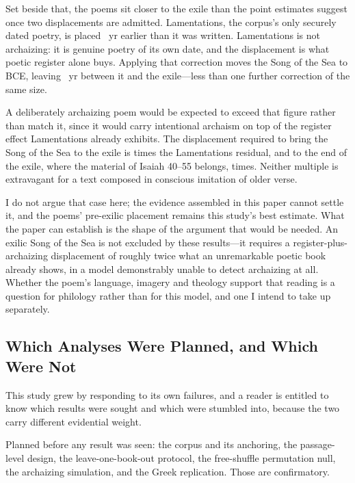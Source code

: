 \documentclass[10pt,letterpaper]{article}
\begin{document}
Set beside that, the poems sit closer to the exile than the point estimates
suggest once two displacements are admitted.  Lamentations, the corpus's only
securely dated poetry, is placed \genPoetryAbs~yr earlier than it was written.
Lamentations is not archaizing: it is genuine poetry of its own date, and the
displacement is what poetic register alone buys.  Applying that correction moves
the Song of the Sea to \DETseaAdj{} BCE, leaving \DETseaAdjMargin~yr between it
and the exile---less than one further correction of the same size.

A deliberately archaizing poem would be expected to exceed that figure rather
than match it, since it would carry intentional archaism on top of the register
effect Lamentations already exhibits.  The displacement required to bring the
Song of the Sea to the exile is \DETseaExileX{} times the Lamentations residual,
and to the end of the exile, where the material of Isaiah 40--55 belongs,
\DETseaDeuteroX{} times.  Neither multiple is extravagant for a text composed in
conscious imitation of older verse.

I do not argue that case here; the evidence assembled in this paper cannot
settle it, and the poems' pre-exilic placement remains this study's best
estimate.  What the paper can establish is the shape of the argument that would
be needed.  An exilic Song of the Sea is not excluded by these results---it
requires a register-plus-archaizing displacement of roughly twice what an
unremarkable poetic book already shows, in a model demonstrably unable to detect
archaizing at all.  Whether the poem's language, imagery and theology support
that reading is a question for philology rather than for this model, and one I
intend to take up separately.

\subsection*{Which Analyses Were Planned, and Which Were Not}

This study grew by responding to its own failures, and a reader is entitled to
know which results were sought and which were stumbled into, because the two
carry different evidential weight.

Planned before any result was seen: the corpus and its anchoring, the
passage-level design, the leave-one-book-out protocol, the free-shuffle
permutation null, the archaizing simulation, and the Greek replication.  Those
are confirmatory.
\end{document}

